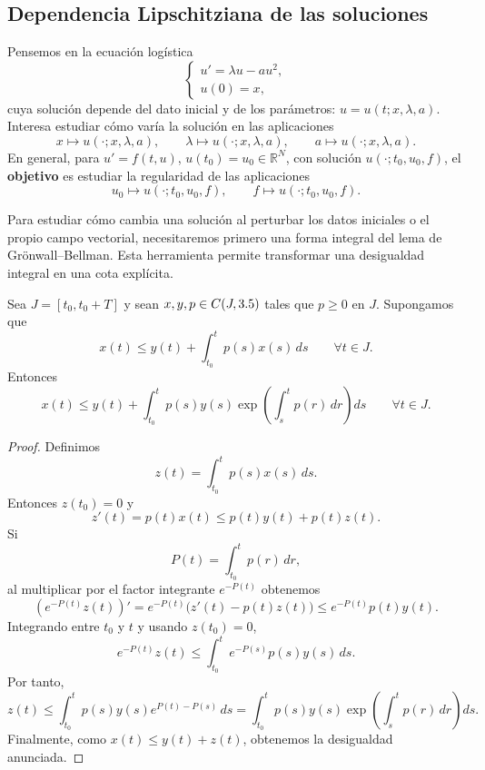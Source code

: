 \subsection{Dependencia Lipschitziana de las soluciones}

Pensemos en la ecuación logística
\[
    \begin{cases}
        u' = \lambda u - a u^2, \\
        u(0) = x,
    \end{cases}
\]
cuya solución depende del dato inicial y de los parámetros: $u = u(t; x, \lambda, a)$. Interesa estudiar cómo varía la solución en las aplicaciones
\[
    x \longmapsto u(\cdot; x, \lambda, a), \qquad \lambda \longmapsto u(\cdot; x, \lambda, a), \qquad a \longmapsto u(\cdot; x, \lambda, a).
\]
En general, para $u' = f(t,u)$, $u(t_0) = u_0 \in \mathbb{R}^N$, con solución $u(\cdot; t_0, u_0, f)$, el \textbf{objetivo} es estudiar la regularidad de las aplicaciones
\[
    u_0 \longmapsto u(\cdot; t_0, u_0, f), \qquad f \longmapsto u(\cdot; t_0, u_0, f).
\]


Para estudiar cómo cambia una solución al perturbar los datos iniciales o el propio campo vectorial, necesitaremos primero una forma integral del lema de Grönwall--Bellman. Esta herramienta permite transformar una desigualdad integral en una cota explícita.

\begin{lema}
    Sea $J=[t_0,t_0+T]$ y sean $x,y,p\in C(J,3.5)$ tales que $p\geq0$ en $J$. Supongamos que
    \[
        x(t)\leq y(t)+\int_{t_0}^t p(s)x(s)\,ds
        \qquad \forall t\in J.
    \]
    Entonces
    \[
        x(t)\leq y(t)+\int_{t_0}^t p(s)y(s)
        \exp\left(\int_s^t p(r)\,dr\right)ds
        \qquad \forall t\in J.
    \]
\end{lema}

\begin{proof}
    Definimos
    \[
        z(t)=\int_{t_0}^t p(s)x(s)\,ds.
    \]
    Entonces $z(t_0)=0$ y
    \[
        z'(t)=p(t)x(t)\leq p(t)y(t)+p(t)z(t).
    \]
    Si
    \[
        P(t)=\int_{t_0}^t p(r)\,dr,
    \]
    al multiplicar por el factor integrante $e^{-P(t)}$ obtenemos
    \[
        \left(e^{-P(t)}z(t)\right)'
        =e^{-P(t)}\bigl(z'(t)-p(t)z(t)\bigr)
        \leq e^{-P(t)}p(t)y(t).
    \]
    Integrando entre $t_0$ y $t$ y usando $z(t_0)=0$,
    \[
        e^{-P(t)}z(t)
        \leq
        \int_{t_0}^t e^{-P(s)}p(s)y(s)\,ds.
    \]
    Por tanto,
    \[
        z(t)
        \leq
        \int_{t_0}^t p(s)y(s)e^{P(t)-P(s)}\,ds
        =
        \int_{t_0}^t p(s)y(s)
        \exp\left(\int_s^t p(r)\,dr\right)ds.
    \]
    Finalmente, como $x(t)\leq y(t)+z(t)$, obtenemos la desigualdad anunciada.
\end{proof}

